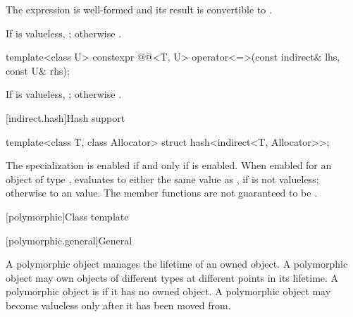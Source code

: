 \begin{itemdescr}
\pnum
\mandates
The expression  is well-formed and
its result is convertible to .

\pnum
\returns
If  is valueless, ;
otherwise .
\end{itemdescr}

%
\begin{itemdecl}
template<class U>
  constexpr @@<T, U>
    operator<=>(const indirect& lhs, const U& rhs);
\end{itemdecl}

\begin{itemdescr}
\pnum
\returns
If  is valueless, ;
otherwise .
\end{itemdescr}

[indirect.hash]{Hash support}

%
\begin{itemdecl}
template<class T, class Allocator>
struct hash<indirect<T, Allocator>>;
\end{itemdecl}

\begin{itemdescr}
\pnum
The specialization 
is enabled if and only if  is enabled.
When enabled for an object  of type ,
 evaluates to
either the same value as ,
if  is not valueless;
otherwise to an
value.
The member functions are not guaranteed to be .
\end{itemdescr}

[polymorphic]{Class template }

[polymorphic.general]{General}

\pnum
A polymorphic object manages the lifetime of an owned object.
A polymorphic object may own objects of
different types at different points in its lifetime.
A polymorphic object is
if it has no owned object.
A polymorphic object may become valueless only after it has been moved from.

